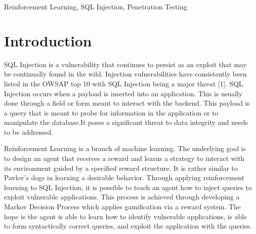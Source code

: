 \documentclass[conference]{IEEEtran}
\begin{document}
\begin{IEEEkeywords}
Reinforcement Learning, SQL Injection, Penetration Testing 
\end{IEEEkeywords}

\section{Introduction}
SQL Injection is a vulnerability that continues to persist as an exploit that may be continually found in the wild. Injection vulnerabilities have consistently been listed in the OWSAP top 10 with SQL Injection being a major threat [1]. SQL Injection occurs when a payload is inserted into an application. This is usually done through a field or form meant to interact with the backend. This payload is a query that is meant to probe for information in the application or to manipulate the database.It poses a significant threat to data integrity and needs to be  addressed. 

Reinforcement Learning is a branch of machine learning. The underlying goal is to design an agent that receives a reward and learns a strategy to interact with its environment guided by a specified reward structure. It is rather similar to Pavlov’s dogs in learning a desirable behavior. Through applying reinforcement learning to SQL Injection, it is possible to teach an agent how to inject queries to exploit vulnerable applications. This process is achieved through developing a Markov Decision Process which applies gamification via a reward system. The hope is the agent is able to learn how to identify vulnerable applications, is able to form syntactically correct queries, and exploit the application with the queries. 
\vspace{1mm} %
\end{document}
